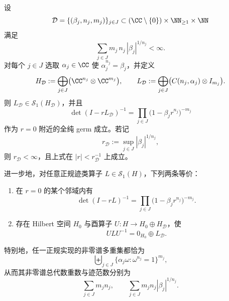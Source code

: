 \begin{theorem}\label{thm:cyclic-fredholm-realisation}
设
\[
\mathcal D=\{(\beta_j,n_j,m_j)\}_{j\in J}
\subset (\CC\setminus\{0\})\times \NN_{\ge 1}\times \NN
\]
满足
\[
\sum_{j\in J}m_j\,n_j\,|\beta_j|^{1/n_j}<\infty.
\]
对每个 \(j\in J\) 选取 \(\alpha_j\in\CC\) 使 \(\alpha_j^{n_j}=\beta_j\)，并定义
\[
H_{\mathcal D}:=\bigoplus_{j\in J}\bigl(\CC^{n_j}\otimes \CC^{m_j}\bigr),
\qquad
L_{\mathcal D}:=\bigoplus_{j\in J}\bigl(C(n_j,\alpha_j)\otimes I_{m_j}\bigr).
\]
则 \(L_{\mathcal D}\in\mathcal{S}_1(H_{\mathcal D})\)，并且
\[
\det(I-rL_{\mathcal D})^{-1}
=\prod_{j\in J}\bigl(1-\beta_j r^{n_j}\bigr)^{-m_j}
\]
作为 \(r=0\) 附近的全纯 germ 成立。若记
\[
r_{\mathcal D}:=\sup_{j\in J}|\beta_j|^{1/n_j},
\]
则 \(r_{\mathcal D}<\infty\)，且上式在 \(|r|<r_{\mathcal D}^{-1}\) 上成立。

进一步地，对任意正规迹类算子 \(L\in\mathcal{S}_1(H)\)，下列两条等价：
\begin{enumerate}
  \item 在 \(r=0\) 的某个邻域内有
  \[
  \det(I-rL)^{-1}
  =\prod_{j\in J}\bigl(1-\beta_j r^{n_j}\bigr)^{-m_j}.
  \]
  \item 存在 Hilbert 空间 \(H_0\) 与酉算子 \(U:H\to H_0\oplus H_{\mathcal D}\)，使
  \[
  ULU^{-1}=0_{H_0}\oplus L_{\mathcal D}.
  \]
\end{enumerate}
特别地，任一正规实现的非零谱多重集都恰为
\[
\biguplus_{j\in J}\bigl\{\alpha_j\omega:\omega^{n_j}=1\bigr\}^{m_j},
\]
从而其非零谱总代数重数与迹范数分别为
\[
\sum_{j\in J}m_jn_j,
\qquad
\sum_{j\in J}m_jn_j|\beta_j|^{1/n_j}.
\]
\end{theorem}

